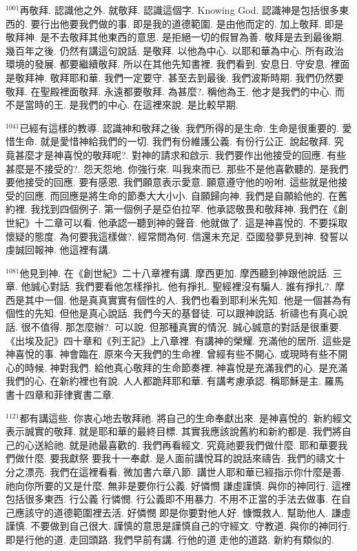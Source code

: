 \documentclass{book}
\begin{document}
$^{1001}$再敬拜.
認識他之外.
就敬拜.
認識這個字.
Knowing God.
認識神是包括很多東西的.
要行出他要我們做的事.
即是我的道德範圍.
是由他而定的.
加上敬拜.
即是敬拜神.
是不去敬拜其他東西的意思.
是拒絕一切的假冒為善.
敬拜是去到最後期.
幾百年之後.
仍然有講這句說話.
是敬拜.
以他為中心.
以耶和華為中心.
所有政治環境的發展.
都要繼續敬拜.
所以在其他先知書裡.
我們看到.
安息日.
守安息.
裡面是敬拜神.
敬拜耶和華.
我們一定要守.
甚至去到最後.
我們波斯時期.
我們仍然要敬拜.
在聖殿裡面敬拜.
永遠都要敬拜.
為甚麼?.
稱他為王.
他才是我們的中心.
而不是當時的王.
是我們的中心.
在這裡來說.
是比較早期.

$^{1041}$已經有這樣的教導.
認識神和敬拜之後.
我們所得的是生命.
生命是很重要的.
愛惜生命.
就是愛惜神給我們的一切.
我們有份維護公義.
有份行公正.
說起敬拜.
究竟甚麼才是神喜悅的敬拜呢?.
對神的請求和啟示.
我們要作出他接受的回應.
有些甚麼是不接受的?.
怨天怨地.
你強行來.
叫我來而已.
那些不是他喜歡聽的.
是我們要他接受的回應.
要有感恩.
我們願意表示愛意.
願意遵守他的吩咐.
這些就是他接受的回應.
而回應是將生命的節奏大大小小.
自願歸向神.
我們是自願給他的.
在舊約裡.
我找到四個例子.
第一個例子是亞伯拉罕.
他承認敬畏和敬拜神.
我們在《創世紀》十二章可以看.
他承認一聽到神的聲音.
他就做了.
這是神喜悅的.
不要採取懷疑的態度.
為何要我這樣做?.
經常問為何.
信還未充足.
亞國發夢見到神.
發誓以虔誠回報神.
他這裡有講.

$^{1081}$他見到神.
在《創世紀》二十八章裡有講.
摩西更加.
摩西聽到神跟他說話.
三章.
他誠心對話.
我們要看他怎樣掙扎.
他有掙扎.
聖經裡沒有騙人.
誰有掙扎?.
摩西是其中一個.
他是真真實實有個性的人.
我們也看到耶利米先知.
他是一個甚為有個性的先知.
但他是真心說話.
我們今天的基督徒.
可以跟神說話.
祈禱也有真心說話.
很不值得.
那怎麼辦?.
可以說.
但那種真實的情況.
誠心誠意的對話是很重要.
《出埃及記》四十章和《列王記》上八章裡.
有講神的榮耀.
充滿他的居所.
這些是神喜悅的事.
神會臨在.
原來今天我們的生命裡.
曾經有些不開心.
或現時有些不開心的時候.
神對我們.
給他真心敬拜的生命節奏裡.
神喜悅是充滿我們的心.
是充滿我們的心.
在新約裡也有說.
人人都跪拜耶和華.
有講考慮承認.
稱耶穌是主.
羅馬書十四章和菲律賓書二章.

$^{1121}$都有講這些.
你衷心地去敬拜祂.
將自己的生命奉獻出來.
是神喜悅的.
新約經文表示誠實的敬拜.
就是耶和華的最終目標.
其實我應該說舊約和新約都是.
我們將自己的心送給祂.
就是祂最喜歡的.
我們再看經文.
究竟祂要我們做什麼.
耶和華要我們做什麼.
要我獻祭 要我十一奉獻.
是人面前講悅耳的說話來禱告.
我們的禱文十分之漂亮.
我們在這裡看看.
微加書六章八節.
講世人耶和華已經指示你什麼是善.
祂向你所要的又是什麼.
無非是要你行公義.
好憐憫 謙虛謹慎.
與你的神同行.
這裡包括很多東西.
行公義 行憐憫.
行公義即不用暴力.
不用不正當的手法去做事.
在自己應該守的道德範圍裡去活.
好憐憫 即是你要對他人好.
慷慨救人.
幫助他人.
謙虛謹慎.
不要做到自己很大.
謹慎的意思是謹慎自己的守經文.
守教道.
與你的神同行.
即是行他的道.
走回頭路.
我們早前有講.
行他的道 走他的道路.
新約有類似的.
\end{document}
